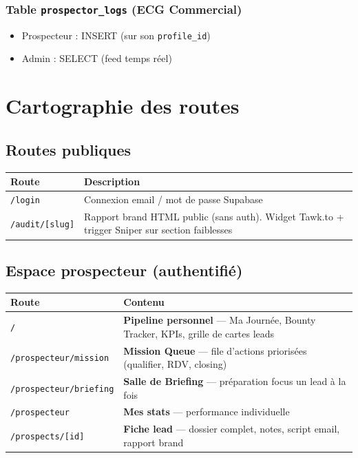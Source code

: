 \documentclass[11pt,a4paper]{report}
\begin{document}
\subsection{Table \texttt{prospector\_logs} (ECG Commercial)}
\begin{itemize}[noitemsep]
  \item Prospecteur : INSERT (sur son \texttt{profile\_id})
  \item Admin : SELECT (feed temps réel)
\end{itemize}

\chapter{Cartographie des routes}

\section{Routes publiques}

\begin{longtable}{@{}p{4.5cm}p{9cm}@{}}
\toprule
\textbf{Route} & \textbf{Description} \\
\midrule
\endhead
\texttt{/login} & Connexion email / mot de passe Supabase \\
\texttt{/audit/[slug]} & Rapport brand HTML public (sans auth). Widget Tawk.to + trigger Sniper sur section faiblesses \\
\bottomrule
\end{longtable}

\section{Espace prospecteur (authentifié)}

\begin{longtable}{@{}p{4.5cm}p{9cm}@{}}
\toprule
\textbf{Route} & \textbf{Contenu} \\
\midrule
\endhead
\texttt{/} & \textbf{Pipeline personnel} --- Ma Journée, Bounty Tracker, KPIs, grille de cartes leads \\
\texttt{/prospecteur/mission} & \textbf{Mission Queue} --- file d'actions priorisées (qualifier, RDV, closing) \\
\texttt{/prospecteur/briefing} & \textbf{Salle de Briefing} --- préparation focus un lead à la fois \\
\texttt{/prospecteur} & \textbf{Mes stats} --- performance individuelle \\
\texttt{/prospects/[id]} & \textbf{Fiche lead} --- dossier complet, notes, script email, rapport brand \\
\bottomrule
\end{longtable}
\end{document}
